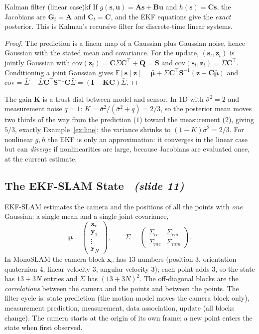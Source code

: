 \documentclass[11pt,a4paper]{article}
\newcommand{\slrs}[1]{\texorpdfstring{\ \emph{(slide #1)}}{ (slide #1)}}
\newcommand{\bx}{\mathbf{x}}
\newcommand{\by}{\mathbf{y}}
\newcommand{\bz}{\mathbf{z}}
\newcommand{\bu}{\mathbf{u}}
\newcommand{\bs}{\mathbf{s}}
\newcommand{\bK}{\mathbf{K}}
\newcommand{\bS}{\mathbf{S}}
\newcommand{\bG}{\mathbf{G}}
\newcommand{\bC}{\mathbf{C}}
\newcommand{\bI}{\mathbf{I}}
\begin{document}
\begin{theorem}{Kalman filter (linear case)}{kf}
If $g(\bs,\bu)=\mathbf A\bs+\mathbf B\bu$ and $h(\bs)=\mathbf C\bs$, the Jacobians are $\bG_t=\mathbf A$ and $\bC_t=\mathbf C$, and the EKF equations give the \emph{exact} posterior. This is Kalman's recursive filter for discrete-time linear systems.
\end{theorem}
\begin{proof}
The prediction is a linear map of a Gaussian plus Gaussian noise, hence Gaussian with the stated mean and covariance. For the update, $(\bs_t,\bz_t)$ is jointly Gaussian with $\mathrm{cov}(\bz_t)=\mathbf C\bar\Sigma\mathbf C^\top+\mathbf Q=\bS$ and $\mathrm{cov}(\bs_t,\bz_t)=\bar\Sigma\mathbf C^\top$. Conditioning a joint Gaussian gives $\mathbb E[\bs\mid\bz]=\bar{\boldsymbol\mu}+\bar\Sigma\mathbf C^\top\bS^{-1}(\bz-\mathbf C\bar{\boldsymbol\mu})$ and $\mathrm{cov}=\bar\Sigma-\bar\Sigma\mathbf C^\top\bS^{-1}\mathbf C\bar\Sigma=(\bI-\bK\mathbf C)\bar\Sigma$. \qedhere
\end{proof}
\begin{intuition}
The gain $\bK$ is a trust dial between model and sensor. In 1D with $\bar\sigma^2=2$ and measurement noise $q=1$: $K=\bar\sigma^2/(\bar\sigma^2+q)=2/3$, so the posterior mean moves two thirds of the way from the prediction ($1$) toward the measurement ($2$), giving $5/3$, exactly Example~\ref{ex:line}; the variance shrinks to $(1-K)\bar\sigma^2=2/3$. For nonlinear $g,h$ the EKF is only an approximation: it converges in the linear case but can \emph{diverge} if nonlinearities are large, because Jacobians are evaluated once, at the current estimate.
\end{intuition}

\subsection{The EKF-SLAM State \slrs{11}}
EKF-SLAM estimates the camera and the positions of all the points with \emph{one} Gaussian: a single mean and a single joint covariance,
\[
\boldsymbol\mu=\begin{pmatrix}\bx_c\\\by_1\\\vdots\\\by_N\end{pmatrix},\qquad
\Sigma=\begin{pmatrix}\Sigma_{cc}&\Sigma_{cm}\\\Sigma_{mc}&\Sigma_{mm}\end{pmatrix}.
\]
In MonoSLAM the camera block $\bx_c$ has 13 numbers (position 3, orientation quaternion 4, linear velocity 3, angular velocity 3); each point adds 3, so the state has $13+3N$ entries and $\Sigma$ has $(13+3N)^2$. The off-diagonal blocks are the \emph{correlations} between the camera and the points and between the points. The filter cycle is: state prediction (the motion model moves the camera block only), measurement prediction, measurement, data association, update (all blocks change). The camera starts at the origin of its own frame; a new point enters the state when first observed.
\end{document}

